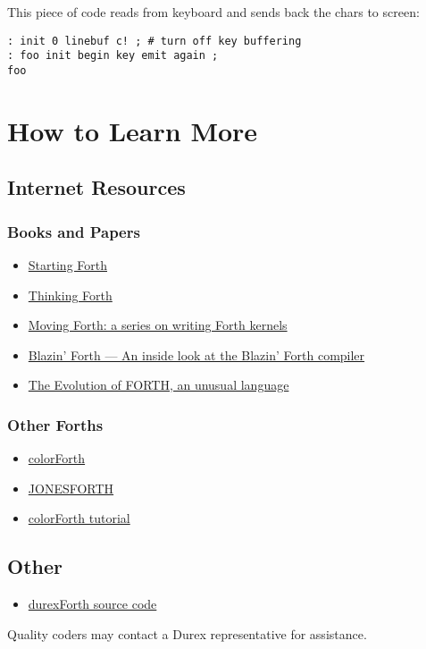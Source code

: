 This piece of code reads from keyboard and sends back the chars to screen:

\begin{verbatim}
: init 0 linebuf c! ; # turn off key buffering
: foo init begin key emit again ;
foo
\end{verbatim}

\section{How to Learn More}

\subsection{Internet Resources}

\subsubsection{Books and Papers}

\begin{itemize}
\item \href{http://www.forth.com/starting-forth/}{Starting Forth}
\item \href{http://thinking-forth.sourceforge.net/}{Thinking Forth}
\item \href{http://www.bradrodriguez.com/papers/}{Moving Forth: a series on writing Forth kernels}
\item \href{http://www.csbruce.com/~csbruce/cbm/transactor/v7/i5/p058.html}{Blazin' Forth --- An inside look at the Blazin' Forth compiler}
\item \href{http://dobbscodetalk.com/index.php?option=com_myblog&show=In-this-1980-article-from-Byte-Charles-Moore-recounts-the-creation-of-Forth..html&Itemid=29}{The Evolution of FORTH, an unusual language}
\end{itemize}

\subsubsection{Other Forths}

\begin{itemize}
\item \href{http://www.colorforth.com/cf.html}{colorForth}
\item \href{http://www.annexia.org/forth}{JONESFORTH}
\item \href{http://colorforthray.info/}{colorForth tutorial}
\end{itemize}

\subsection{Other}

\begin{itemize}
\item \href{http://code.google.com/p/durexforth/}{durexForth source code}
\end{itemize}

Quality coders may contact a Durex representative for assistance.
